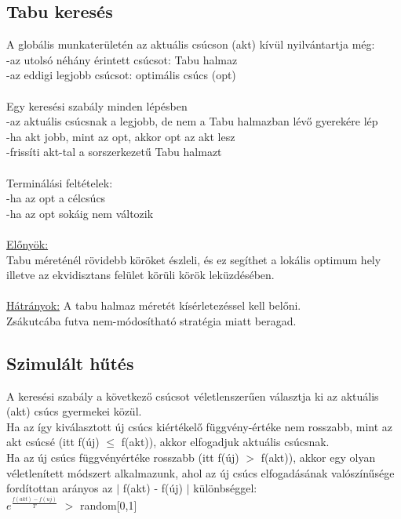 \documentclass{article}
\begin{document}
	 \newpage
	 \subsection{Tabu keresés}
	 A globális munkaterületén az aktuális csúcson (akt) kívül nyilvántartja még:\\
	 \hspace*{0,5em} -az utolsó néhány érintett csúcsot: Tabu halmaz\\
	 \hspace*{0,5em} -az eddigi legjobb csúcsot: optimális csúcs (opt)\\ \\
	 Egy keresési szabály minden lépésben\\
	 \hspace*{0,5em} -az aktuális csúcsnak a legjobb, de nem a Tabu halmazban lévő gyerekére lép\\
	 \hspace*{0,5em} -ha akt jobb, mint az opt, akkor opt az akt lesz\\
	 \hspace*{0,5em} -frissíti akt-tal a sorszerkezetű Tabu halmazt\\ \\
	 Terminálási feltételek:\\
	 \hspace*{0,5em} -ha az opt a célcsúcs\\
	 \hspace*{0,5em} -ha az opt sokáig nem változik \\ \\
	 \underline{Előnyök:}\\
	 Tabu méreténél rövidebb köröket észleli, és ez segíthet a lokális optimum hely illetve az ekvidisztans felület körüli körök leküzdésében.\\ \\
	 \underline{Hátrányok:}
	 A tabu halmaz méretét kísérletezéssel kell belőni. \\
	 Zsákutcába futva nem-módosítható stratégia miatt beragad.
	 
	 \subsection{Szimulált hűtés}
	 A keresési szabály a következő csúcsot véletlenszerűen választja ki az aktuális (akt) csúcs gyermekei közül.\\
	 Ha az így kiválasztott új csúcs kiértékelő függvény-értéke nem rosszabb, mint az akt csúcsé (itt f(új) $\leq$ f(akt)), akkor elfogadjuk aktuális csúcsnak.\\
	 Ha az új csúcs függvényértéke rosszabb (itt f(új) $>$ f(akt)), akkor egy olyan véletlenített módszert alkalmazunk, ahol az új csúcs elfogadásának valószínűsége fordítottan arányos az $|$ f(akt) - f(új) $|$ különbséggel: \\
	 $e^\frac{f(akt)-f(uj)}{T}$ $>$ random[0,1] \\
	 
\end{document}
